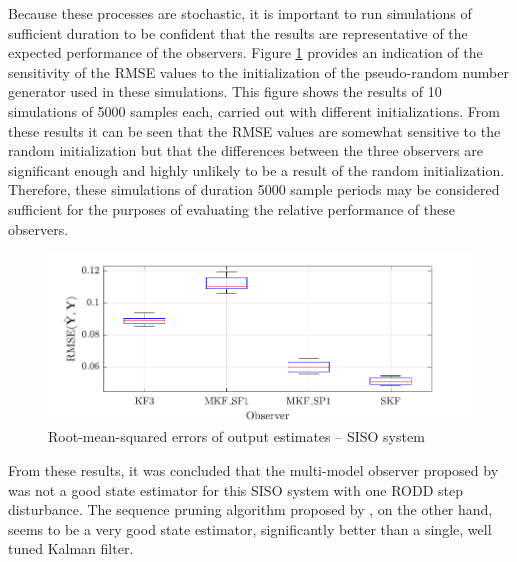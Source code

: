 Because these processes are stochastic, it is important to run simulations of sufficient duration to be confident that the results are representative of the expected performance of the observers. Figure \ref{fig:rod-obs-sim1-yest-all-seed-RMSE-box} provides an indication of the sensitivity of the RMSE values to the initialization of the pseudo-random number generator used in these simulations. This figure shows the results of 10 simulations of 5000 samples each, carried out with different initializations. From these results it can be seen that the RMSE values are somewhat sensitive to the random initialization but that the differences between the three observers are significant enough and highly unlikely to be a result of the random initialization. Therefore, these simulations of duration 5000 sample periods may be considered sufficient for the purposes of evaluating the relative performance of these observers.
\begin{figure}[htp]
	\centering
	\includegraphics[width=12cm]{images/rod_obs_sim1_all_seed_y_err_box.pdf}
	\caption{Root-mean-squared errors of output estimates – SISO system}
	\label{fig:rod-obs-sim1-yest-all-seed-RMSE-box}
\end{figure}

From these results, it was concluded that the multi-model observer proposed by \cite{robertson_method_1998} was not a good state estimator for this SISO system with one RODD step disturbance. The sequence pruning algorithm proposed by \cite{eriksson_classification_1996}, on the other hand, seems to be a very good state estimator, significantly better than a single, well tuned Kalman filter.

%
%
%

